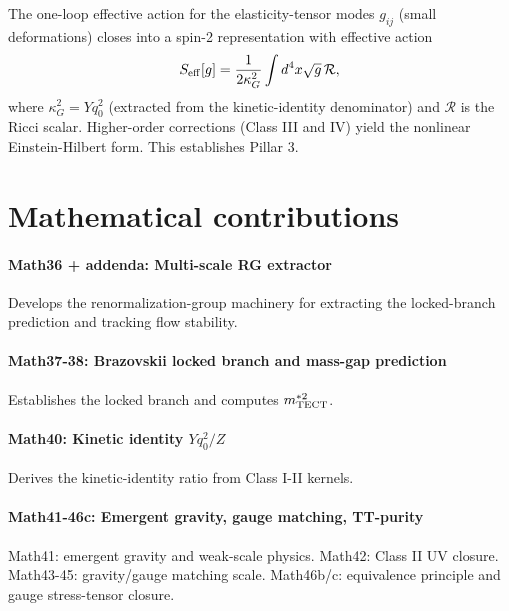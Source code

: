 \begin{theorem}
\label{thm:gravity}
The one-loop effective action for the elasticity-tensor modes $g_{ij}$ (small deformations)
closes into a spin-2 representation with effective action
\begin{equation}
S_{\rm eff}[g] = \frac{1}{2\kappa_G^2} \int d^4x \sqrt{g} \, \mathcal{R},
\label{eq:einstein_hilbert}
\end{equation}
where $\kappa_G^2 = Y q_0^2$ (extracted from the kinetic-identity denominator) and
$\mathcal{R}$ is the Ricci scalar. Higher-order corrections (Class III and IV) yield
the nonlinear Einstein-Hilbert form. This establishes Pillar 3.
\end{theorem}

\section{Mathematical contributions}

\paragraph{Math36 + addenda: Multi-scale RG extractor}
Develops the renormalization-group machinery for extracting the locked-branch prediction
and tracking flow stability. \cite{Math36}

\paragraph{Math37-38: Brazovskii locked branch and mass-gap prediction}
Establishes the locked branch and computes $m^{*2}_{\rm TECT}$. \cite{Math37, Math38}

\paragraph{Math40: Kinetic identity $Yq_0^2 / Z$}
Derives the kinetic-identity ratio from Class I-II kernels. \cite{Math40}

\paragraph{Math41-46c: Emergent gravity, gauge matching, TT-purity}
Math41: emergent gravity and weak-scale physics. Math42: Class II UV closure. Math43-45:
gravity/gauge matching scale. Math46b/c: equivalence principle and gauge stress-tensor
closure. \cite{Math41, Math42, Math43, Math44, Math45, Math46b, Math46c}

